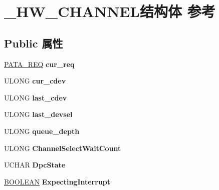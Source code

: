\hypertarget{struct___h_w___c_h_a_n_n_e_l}{}\section{\+\_\+\+H\+W\+\_\+\+C\+H\+A\+N\+N\+E\+L结构体 参考}
\label{struct___h_w___c_h_a_n_n_e_l}
\subsection*{Public 属性}
\begin{DoxyCompactItemize}
\item 
\mbox{\label{struct___h_w___c_h_a_n_n_e_l_a070cd1cc69acb5a199d103b84354788a}} 
\hyperlink{union___a_t_a___r_e_q}{P\+A\+T\+A\+\_\+\+R\+EQ} {\bfseries cur\+\_\+req}
\item 
\mbox{\label{struct___h_w___c_h_a_n_n_e_l_a3d40d0cc4a2a926d8654d08638f145cc}} 
U\+L\+O\+NG {\bfseries cur\+\_\+cdev}
\item 
\mbox{\label{struct___h_w___c_h_a_n_n_e_l_ace7ce21d1f1b367bd3f71cbe61814590}} 
U\+L\+O\+NG {\bfseries last\+\_\+cdev}
\item 
\mbox{\label{struct___h_w___c_h_a_n_n_e_l_a570a10573428c0553643980b7c6bc562}} 
U\+L\+O\+NG {\bfseries last\+\_\+devsel}
\item 
\mbox{\label{struct___h_w___c_h_a_n_n_e_l_a0bc68fc8432374bdd06d97420376cb1e}} 
U\+L\+O\+NG {\bfseries queue\+\_\+depth}
\item 
\mbox{\label{struct___h_w___c_h_a_n_n_e_l_a0e902f555fc06fb8dff88df6d2550aa6}} 
U\+L\+O\+NG {\bfseries Channel\+Select\+Wait\+Count}
\item 
\mbox{\label{struct___h_w___c_h_a_n_n_e_l_a9981d828cb3684c22615916908f9becc}} 
U\+C\+H\+AR {\bfseries Dpc\+State}
\item 
\mbox{\label{struct___h_w___c_h_a_n_n_e_l_aa57cd58d49300cf70aa3a945a0668a2b}} 
\hyperlink{_processor_bind_8h_a112e3146cb38b6ee95e64d85842e380a}{B\+O\+O\+L\+E\+AN} {\bfseries Expecting\+Interrupt}

\end{DoxyCompactItemize}
